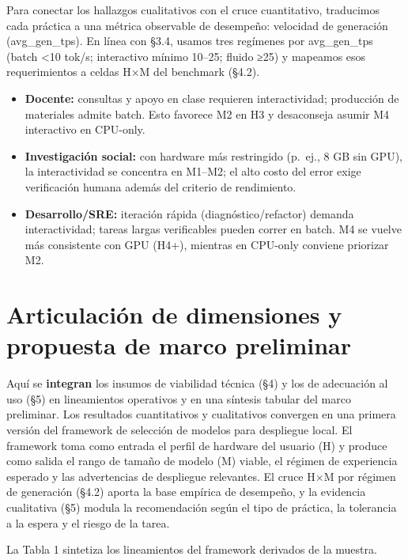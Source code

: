 \documentclass{llncs}
\providecommand{\tightlist}{%
  \setlength{\itemsep}{0pt}\setlength{\parskip}{0pt}}
\begin{document}
Para conectar los hallazgos cualitativos con el cruce cuantitativo,
traducimos cada práctica a una métrica observable de desempeño:
velocidad de generación (avg\_gen\_tps). En línea con §3.4, usamos tres
regímenes por avg\_gen\_tps (batch \textless10 tok/s; interactivo mínimo
10--25; fluido ≥25) y mapeamos esos requerimientos a celdas H×M del
benchmark (§4.2).

\begin{itemize}
\tightlist
\item
  \textbf{Docente:} consultas y apoyo en clase requieren interactividad;
  producción de materiales admite batch. Esto favorece M2 en H3 y
  desaconseja asumir M4 interactivo en CPU-only.
\item
  \textbf{Investigación social:} con hardware más restringido (p.~ej., 8
  GB sin GPU), la interactividad se concentra en M1--M2; el alto costo
  del error exige verificación humana además del criterio de
  rendimiento.
\item
  \textbf{Desarrollo/SRE:} iteración rápida (diagnóstico/refactor)
  demanda interactividad; tareas largas verificables pueden correr en
  batch. M4 se vuelve más consistente con GPU (H4+), mientras en
  CPU-only conviene priorizar M2.
\end{itemize}

\section{Articulación de dimensiones y propuesta de marco preliminar}\label{sintesis-framework}

Aquí se \textbf{integran} los insumos de viabilidad técnica (§4) y los de adecuación al uso (§5) en lineamientos operativos y en una síntesis tabular del marco preliminar. Los resultados cuantitativos y cualitativos convergen en una primera versión del framework de selección de modelos para despliegue local. El framework toma como entrada el perfil de hardware del usuario (H) y produce como salida el rango de tamaño de modelo (M) viable, el régimen de experiencia esperado y las advertencias de despliegue relevantes. El cruce H×M por régimen de generación (§4.2) aporta la base empírica de desempeño, y la evidencia cualitativa (§5) modula la recomendación según el tipo de práctica, la tolerancia a la espera y el riesgo de la tarea.

La Tabla 1 sintetiza los lineamientos del framework derivados de la muestra.
\end{document}
